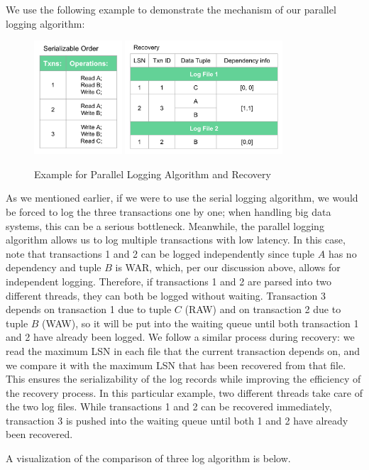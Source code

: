 We use the following example to demonstrate the mechanism of our parallel logging algorithm: 
\begin{figure}[!h]
\caption{Example for Parallel Logging Algorithm and Recovery}
\centering
\includegraphics[height=120pt]{Parallel.png}
\hspace{20pt}
\includegraphics[height=120pt]{Parallel_re.png}
\end{figure}\par
As we mentioned earlier, if we were to use the serial logging algorithm, we would be forced to log the three transactions one by one; when handling big data systems, this can be a serious bottleneck. Meanwhile, the parallel logging algorithm allows us to log multiple transactions with low latency. In this case, note that transactions 1 and 2 can be logged independently since tuple $A$ has no dependency and tuple $B$ is WAR, which, per our discussion above, allows for independent logging. Therefore, if transactions 1 and 2 are parsed into two different threads, they can both be logged without waiting. Transaction 3 depends on transaction 1 due to tuple $C$ (RAW) and on transaction 2 due to tuple $B$ (WAW), so it will be put into the waiting queue until both transaction 1 and 2 have already been logged. 
We follow a similar process during recovery: we read the maximum LSN in each file that the current transaction depends on, and we compare it with the maximum LSN that has been recovered from that file. This ensures the serializability of the log records while improving the efficiency of the recovery process. In this particular example, two different threads take care of the two log files. While transactions 1 and 2 can be recovered immediately, transaction 3 is pushed into the waiting queue until both 1 and 2 have already been recovered.\par
A visualization of the comparison of three log algorithm is below.  